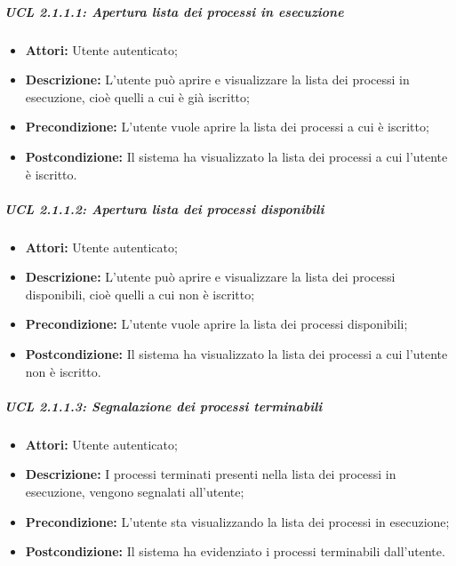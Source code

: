 \subparagraph{UCL 2.1.1.1: Apertura lista dei processi in esecuzione}
\begin{itemize}
\item \textbf{Attori:} Utente autenticato;
\item \textbf{Descrizione:} L'utente può aprire e visualizzare la lista dei processi in esecuzione, cioè quelli a cui è già iscritto;
\item \textbf{Precondizione:} L'utente vuole aprire la lista dei processi a cui è iscritto;
\item \textbf{Postcondizione:} Il sistema ha visualizzato la lista dei processi a cui l'utente è iscritto.
\end{itemize}

\subparagraph{UCL 2.1.1.2: Apertura lista dei processi disponibili}
\begin{itemize}
\item \textbf{Attori:} Utente autenticato;
\item \textbf{Descrizione:} L'utente può aprire e visualizzare la lista dei processi disponibili, cioè quelli a cui non è iscritto;
\item \textbf{Precondizione:} L'utente vuole aprire la lista dei processi disponibili;
\item \textbf{Postcondizione:} Il sistema ha visualizzato la lista dei processi a cui l'utente non è iscritto.
\end{itemize}

\subparagraph{UCL 2.1.1.3: Segnalazione dei processi terminabili}
\begin{itemize}
\item \textbf{Attori:} Utente autenticato;
\item \textbf{Descrizione:} I processi terminati presenti nella lista dei processi in esecuzione, vengono segnalati all'utente;
\item \textbf{Precondizione:} L'utente sta visualizzando la lista dei processi in esecuzione;
\item \textbf{Postcondizione:} Il sistema ha evidenziato i processi terminabili dall'utente.
\end{itemize}

